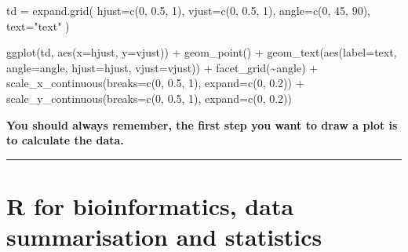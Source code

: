 \documentclass[
]{article}
\newenvironment{Shaded}{}{}
\newcommand{\AttributeTok}[1]{\textcolor[rgb]{0.49,0.56,0.16}{#1}}
\newcommand{\DecValTok}[1]{\textcolor[rgb]{0.25,0.63,0.44}{#1}}
\newcommand{\FloatTok}[1]{\textcolor[rgb]{0.25,0.63,0.44}{#1}}
\newcommand{\FunctionTok}[1]{\textcolor[rgb]{0.02,0.16,0.49}{#1}}
\newcommand{\NormalTok}[1]{#1}
\newcommand{\OtherTok}[1]{\textcolor[rgb]{0.00,0.44,0.13}{#1}}
\newcommand{\SpecialCharTok}[1]{\textcolor[rgb]{0.25,0.44,0.63}{#1}}
\newcommand{\StringTok}[1]{\textcolor[rgb]{0.25,0.44,0.63}{#1}}
\begin{document}
\begin{Shaded}
\begin{Highlighting}[]
\NormalTok{td }\OtherTok{=} \FunctionTok{expand.grid}\NormalTok{(}
    \AttributeTok{hjust=}\FunctionTok{c}\NormalTok{(}\DecValTok{0}\NormalTok{, }\FloatTok{0.5}\NormalTok{, }\DecValTok{1}\NormalTok{),}
    \AttributeTok{vjust=}\FunctionTok{c}\NormalTok{(}\DecValTok{0}\NormalTok{, }\FloatTok{0.5}\NormalTok{, }\DecValTok{1}\NormalTok{),}
    \AttributeTok{angle=}\FunctionTok{c}\NormalTok{(}\DecValTok{0}\NormalTok{, }\DecValTok{45}\NormalTok{, }\DecValTok{90}\NormalTok{),}
    \AttributeTok{text=}\StringTok{"text"}
\NormalTok{)}

\FunctionTok{ggplot}\NormalTok{(td, }\FunctionTok{aes}\NormalTok{(}\AttributeTok{x=}\NormalTok{hjust, }\AttributeTok{y=}\NormalTok{vjust)) }\SpecialCharTok{+} 
    \FunctionTok{geom\_point}\NormalTok{() }\SpecialCharTok{+}
    \FunctionTok{geom\_text}\NormalTok{(}\FunctionTok{aes}\NormalTok{(}\AttributeTok{label=}\NormalTok{text, }\AttributeTok{angle=}\NormalTok{angle, }\AttributeTok{hjust=}\NormalTok{hjust, }\AttributeTok{vjust=}\NormalTok{vjust)) }\SpecialCharTok{+} 
    \FunctionTok{facet\_grid}\NormalTok{(}\SpecialCharTok{\textasciitilde{}}\NormalTok{angle) }\SpecialCharTok{+}
    \FunctionTok{scale\_x\_continuous}\NormalTok{(}\AttributeTok{breaks=}\FunctionTok{c}\NormalTok{(}\DecValTok{0}\NormalTok{, }\FloatTok{0.5}\NormalTok{, }\DecValTok{1}\NormalTok{), }\AttributeTok{expand=}\FunctionTok{c}\NormalTok{(}\DecValTok{0}\NormalTok{, }\FloatTok{0.2}\NormalTok{)) }\SpecialCharTok{+}
    \FunctionTok{scale\_y\_continuous}\NormalTok{(}\AttributeTok{breaks=}\FunctionTok{c}\NormalTok{(}\DecValTok{0}\NormalTok{, }\FloatTok{0.5}\NormalTok{, }\DecValTok{1}\NormalTok{), }\AttributeTok{expand=}\FunctionTok{c}\NormalTok{(}\DecValTok{0}\NormalTok{, }\FloatTok{0.2}\NormalTok{))}
\end{Highlighting}
\end{Shaded}

\textbf{You should always remember, the first step you want to draw a
plot is to calculate the data.}

\begin{center}\rule{0.5\linewidth}{0.5pt}\end{center}

\hypertarget{r-for-bioinformatics-data-summarisation-and-statistics}{%
\section{R for bioinformatics, data summarisation and
statistics}\label{r-for-bioinformatics-data-summarisation-and-statistics}}
\end{document}

